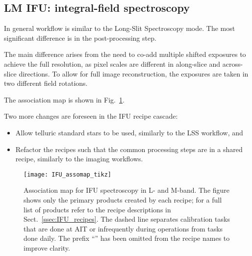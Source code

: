 \subsection{LM IFU: integral-field spectroscopy}
\label{ssec:overview_ifu}

In general workflow is similar to the Long-Slit Spectroscopy mode.
The most significant difference is in the post-processing step.

The main difference arises from the need to co-add multiple shifted exposures
to achieve the full resolution, as pixel scales are different
in along-slice and across-slice directions.
To allow for full image reconstruction, the exposures are taken in two different field rotations.

The association map is shown in Fig.~\ref{Fig:IfuAssomap}.


Two more changes are foreseen in the IFU recipe cascade:
\begin{itemize}
    \item Allow telluric standard stars to be used, similarly to the LSS workflow, and

    \item Refactor the recipes such that the common processing steps are in a shared recipe, similarly to the imaging workflows.
\end{itemize}


\begin{landscape}
\begin{figure}[ht]
  \centering
  \texttt{[image: IFU\_assomap\_tikz]}
  \caption[Reduction cascade and association map for IFU spectroscopy]{%
    Association map for \ac{IFU} spectroscopy in L- and M-band. The
    figure shows only the primary products created by each recipe; for
    a full list of products refer to the recipe descriptions in
    Sect.~\ref{ssec:IFU_recipes}. The dashed line separates
    calibration tasks that are done at AIT or infrequently during
    operations from tasks done daily. The prefix ``'' has been
    omitted from the recipe names to improve clarity.}
  \label{Fig:IfuAssomap}
\end{figure}
\end{landscape}




